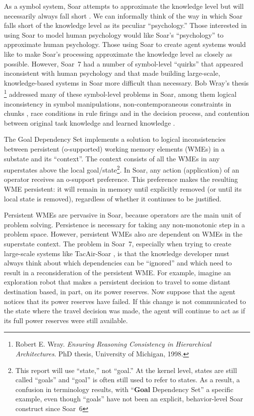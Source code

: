 As a symbol system, Soar attempts to approximate the knowledge level
but will necessarily always fall short \cite{Newell90:UTC}.  We can
informally think of the way in which Soar falls short of the knowledge
level as its peculiar ``psychology.''  Those interested in using Soar
to model human psychology would like Soar's ``psychology'' to
approximate human psychology.  Those using Soar to create agent
systems would like to make Soar's processing approximate the knowledge
level as closely as possible.  However, Soar~7 had a number of
symbol-level ``quirks'' that appeared inconsistent with human
psychology and that made building large-scale, knowledge-based systems
in Soar more difficult than necessary.  Bob Wray's thesis 
\footnote{Robert E. Wray. \textit{Ensuring Reasoning Consistency in Hierarchical Architectures}. PhD thesis, University of Michigan, 1998.}
addressed many of these symbol-level problems
in Soar, among them logical inconsistency in symbol manipulations,
non-contemporaneous constraints in chunks \cite{Wray96:Compilation},
race conditions in rule firings and in the decision process, and
contention between original task knowledge and learned knowledge
\cite{Wray01:Resolving}.

The Goal Dependency Set implements a solution to logical
inconsistencies between persistent (o-supported) working memory
elements (WMEs) in a substate and its ``context''.  The context
consists of all the WMEs in any superstates above the local
goal/state\footnote{This report will use ``state,'' not ``goal.''  At
the kernel level, states are still called ``goals'' and ``goal'' is often
still used to refer to states.    As a result, a
confusion in terminology results, with ``\textbf{Goal} Dependency Set'' a 
specific example, even though ``goals'' have not been
an explicit, behavior-level Soar construct since Soar~6}.  In Soar, any
action (application) of an operator receives an o-support preference.
This preference makes the resulting WME persistent: it will remain in
memory until explicitly removed (or until its local state is removed),
regardless of whether it continues to be justified.

Persistent WMEs are pervasive in Soar, because operators are the main
unit of problem solving.  Persistence is necessary for taking any
non-monotonic step in a problem space.  However, persistent WMEs also
are dependent on WMEs in the superstate context.  The problem in
Soar~7, especially when trying to create large-scale systems like
TacAir-Soar \cite{Jones99:Automated}, is that the knowledge developer
must always think about which dependencies can be ``ignored'' and
which need to result in a reconsideration of the persistent WME.  For
example, imagine an exploration robot that makes a persistent decision
to travel to some distant destination based, in part, on its power
reserves.  Now suppose that the agent notices that its power reserves
have failed.  If this change is not communicated to the state where
the travel decision was made, the agent will continue to act as if its
full power reserves were still available.


